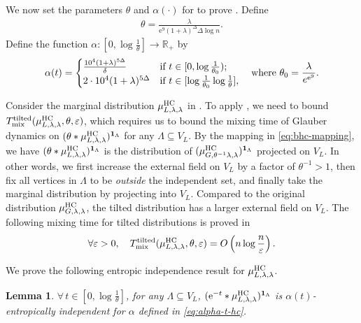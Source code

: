 \documentclass[11pt,a4paper]{article}
\newcommand{\e}{\mathrm{e}}
\renewcommand{\epsilon}{\varepsilon}
\newcommand{\mixtl}{T_{\textnormal{mix}}^{\textnormal{tilted}}}
\newtheorem{lemma}[theorem]{Lemma}
\theoremstyle{definition}
\newcommand{\tuple}[1]{\left(#1\right)} \newcommand{\eps}{\varepsilon}
\newcommand{\tp}{\tuple}
\def\*#1{\mathbf{#1}} %
\begin{document}
We now set the parameters $\theta$ and $\alpha(\cdot)$ for  to prove . Define
\begin{align*}
    \theta=\frac{\lambda}{\e^9 (1+\lambda)^\Delta \Delta\log n}.
\end{align*}
Define the function 
$\alpha:[0,\log\frac{1}{\theta}]\to \mathbb{R}_+$ by
\begin{align}\label{eq:alpha-t-hc}
   \alpha(t)=\begin{cases}
       \frac{10^4(1+\lambda)^{5\Delta}}{\delta
       }  &\textnormal{if } t\in[0,\log \frac{1}{\theta_0});\\ 
       2\cdot 10^4 (1+\lambda)^{5\Delta}& \textnormal{if } t\in[\log\frac{1}{\theta_0} \log \frac{1}{\theta}],
   \end{cases} \quad\text{where } \theta_0 = \frac{\lambda}{e^{\e^9}}.
\end{align}



Consider the marginal distribution $\mu^{\textnormal{HC}}_{L,\lambda,\lambda}$ in . To apply , we need to bound $\mixtl(\mu^{\textnormal{HC}}_{L,\lambda,\lambda}, \theta,\epsilon)$, which requires us to bound the mixing time of Glauber dynamics on $(\theta * \mu^{\textnormal{HC}}_{L,\lambda,\lambda})^{\*1_\Lambda}$ for any $\Lambda \subseteq V_L$. By the mapping in \eqref{eq:bhc-mapping}, we have $(\theta * \mu^{\textnormal{HC}}_{L,\lambda,\lambda})^{\*1_\Lambda}$ is the distribution of $(\mu^{\textnormal{HC}}_{G,\theta^{-1}\lambda,\lambda})^{\*1_\Lambda}$  projected on $V_L$. In other words, we first increase the external field on $V_L$ by a factor of $\theta^{-1} > 1$, then fix all vertices in $\Lambda$ to be \emph{outside} the independent set, and finally take the marginal distribution by projecting into $V_L$. Compared to the original distribution $\mu^{\textnormal{HC}}_{G,\lambda,\lambda}$, the tilted distribution has a larger external field on $V_L$. The following mixing time for tilted distributions is proved in \cite[Lem. 25]{Chen0Y23}
\begin{align}
 \forall \epsilon >0, \quad   \mixtl(\mu_{L,\lambda,\lambda}^{\textnormal{HC}} ,\theta, \epsilon)= O\tp{n \log \frac{n}{\epsilon}}. \label{eq:bhc-mixing-tilted-marginal}
\end{align}

We prove the following entropic independence result for $\mu_{L,\lambda,\lambda}^{\textnormal{HC}}$.
\begin{lemma}\label{lem:HC-EI}
    $\forall\, t\in [0,\log \frac{1}{\theta}]$, for any $\Lambda \subseteq V_L$,  $(\e^{-t} *\mu_{L,\lambda,\lambda}^{\textnormal{HC}})^{\*1_\Lambda}$ is $\alpha(t)$-entropically independent for $\alpha$ defined in \eqref{eq:alpha-t-hc}.
    \end{lemma}
\end{document}
